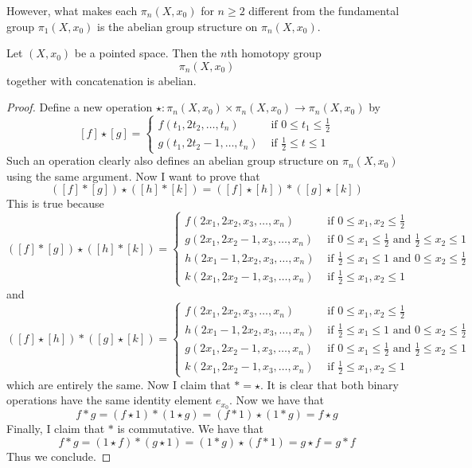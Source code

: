 \documentclass[a4paper]{article}
\begin{document}
However, what makes each $\pi_n(X,x_0)$ for $n\geq 2$ different from the fundamental group $\pi_1(X,x_0)$ is the abelian group structure on $\pi_n(X,x_0)$. 

\begin{thm}{}{} Let $(X,x_0)$ be a pointed space. Then the $n$th homotopy group $$\pi_n(X,x_0)$$ together with concatenation is abelian. \tcbline
\begin{proof}
Define a new operation $\star:\pi_n(X,x_0)\times\pi_n(X,x_0)\to\pi_n(X,x_0)$ by $$[f]\star[g]=\begin{cases}
f(t_1,2t_2,\dots,t_n) & \text{ if } 0\leq t_1\leq\frac{1}{2}\\
g(t_1,2t_2-1,\dots,t_n) & \text{ if } \frac{1}{2}\leq t\leq 1
\end{cases}$$ Such an operation clearly also defines an abelian group structure on $\pi_n(X,x_0)$ using the same argument. Now I want to prove that $$([f]\ast[g])\star([h]\ast [k])=([f]\star [h])\ast([g]\star [k])$$ This is true because $$([f]\ast[g])\star([h]\ast [k])=\begin{cases}
f(2x_1,2x_2,x_3,\dots,x_n) & \text{ if } 0\leq x_1,x_2\leq\frac{1}{2}\\
g(2x_1,2x_2-1,x_3,\dots,x_n) & \text{ if } 0\leq x_1\leq\frac{1}{2} \text{ and } \frac{1}{2}\leq x_2\leq 1\\
h(2x_1-1,2x_2,x_3,\dots,x_n) & \text{ if } \frac{1}{2}\leq x_1\leq 1 \text{ and } 0\leq x_2\leq\frac{1}{2}\\
k(2x_1,2x_2-1,x_3,\dots,x_n) & \text{ if } \frac{1}{2}\leq x_1,x_2\leq 1
\end{cases}$$ and $$([f]\star [h])\ast([g]\star [k])=\begin{cases}
f(2x_1,2x_2,x_3,\dots,x_n) & \text{ if } 0\leq x_1,x_2\leq\frac{1}{2}\\
h(2x_1-1,2x_2,x_3,\dots,x_n) & \text{ if } \frac{1}{2}\leq x_1\leq 1 \text{ and } 0\leq x_2\leq\frac{1}{2}\\
g(2x_1,2x_2-1,x_3,\dots,x_n) & \text{ if } 0\leq x_1\leq\frac{1}{2} \text{ and } \frac{1}{2}\leq x_2\leq 1\\
k(2x_1,2x_2-1,x_3,\dots,x_n) & \text{ if } \frac{1}{2}\leq x_1,x_2\leq 1
\end{cases}$$ which are entirely the same. Now I claim that $\ast=\star$. It is clear that both binary operations have the same identity element $e_{x_0}$. Now we have that $$f\ast g=(f\star 1)\ast (1\star g)=(f\ast 1)\star(1\ast g)=f\star g$$ Finally, I claim that $\ast$ is commutative. We have that $$f\ast g=(1\star f)\ast(g\star 1)=(1\ast g)\star(f\ast 1)=g\star f=g\ast f$$ Thus we conclude. 
\end{proof}
\end{thm}
\end{document}
